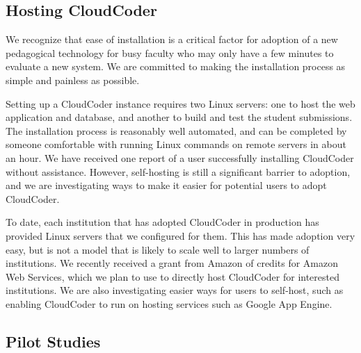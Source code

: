 \documentclass{sig-alternate}
\begin{document}



\subsection{Hosting CloudCoder}

We recognize that ease of installation is a critical factor for
adoption of a new pedagogical technology for busy
faculty who may only have a few minutes to evaluate a new system.  We
are committed to making the installation process as simple and painless as 
possible.

Setting up a CloudCoder instance requires two Linux servers: one to
host the web application and database, and another to build and
test the student submissions.  The installation process is reasonably well
automated, and can be completed by someone comfortable with
running Linux commands on remote servers in about an hour.
We have received one report of a user successfully installing CloudCoder
without assistance.  However, self-hosting is still a significant
barrier to adoption, and we are investigating ways to make it
easier for potential users to adopt CloudCoder.

To date, each institution that has adopted CloudCoder in production has
provided Linux servers that we configured for them.  This has made
adoption very easy, but is not a model that is likely to scale well
to larger numbers of institutions.  We recently received a grant
from Amazon of credits for Amazon Web Services\cite{aws},
which we plan to use to directly host CloudCoder for interested
institutions.  We are also investigating easier ways for
users to self-host, such as enabling CloudCoder to run on
hosting services such as Google App Engine\cite{gae}.

\subsection{Pilot Studies}
\end{document}
